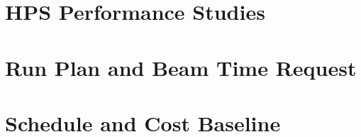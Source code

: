 \documentclass[prc,12pt]{revtex4}
\begin{document}
\section{HPS Performance Studies}
\label{sec:performance}


\clearpage




\section{Run Plan and Beam Time Request}

\section{Schedule and Cost Baseline}


\clearpage




\end{document}
